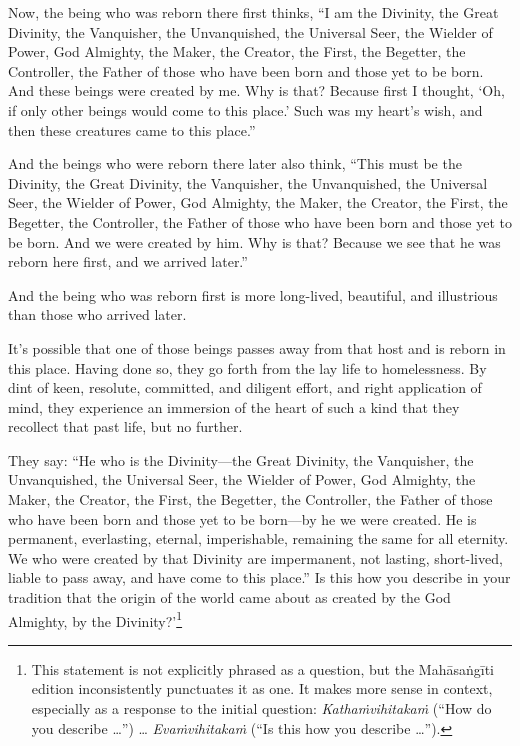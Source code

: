 \documentclass[12pt,openany]{book}%
\begin{document}
Now, the being who was reborn there first thinks, “I am the Divinity, the Great Divinity, the Vanquisher, the Unvanquished, the Universal Seer, the Wielder of Power,  God Almighty, the Maker, the Creator, the First, the Begetter, the Controller, the Father of those who have been born and those yet to be born. And these beings were created by me. Why is that? Because first I thought, ‘Oh, if only other beings would come to this place.’ Such was my heart’s wish, and then these creatures came to this place.” 

And the beings who were reborn there later also think, “This must be the Divinity, the Great Divinity, the Vanquisher, the Unvanquished, the Universal Seer, the Wielder of Power, God Almighty, the Maker, the Creator, the First, the Begetter, the Controller, the Father of those who have been born and those yet to be born. And we were created by him. Why is that? Because we see that he was reborn here first, and we arrived later.” 

And the being who was reborn first is more long-lived, beautiful, and illustrious than those who arrived later. 

It’s possible that one of those beings passes away from that host and is reborn in this place. Having done so, they go forth from the lay life to homelessness. By dint of keen, resolute, committed, and diligent effort, and right application of mind, they experience an immersion of the heart of such a kind that they recollect that past life, but no further. 

They say: “He who is the Divinity—the Great Divinity, the Vanquisher, the Unvanquished, the Universal Seer, the Wielder of Power, God Almighty, the Maker, the Creator, the First, the Begetter, the Controller, the Father of those who have been born and those yet to be born—by he we were created. He is permanent, everlasting, eternal, imperishable, remaining the same for all eternity. We who were created by that Divinity are impermanent, not lasting, short-lived, liable to pass away, and have come to this place.” Is this how you describe in your tradition that the origin of the world came about as created by the God Almighty, by the Divinity?’\footnote{This statement is not explicitly phrased as a question, but the \textsanskrit{Mahāsaṅgīti} edition inconsistently punctuates it as one. It makes more sense in context, especially as a response to the initial question: \textit{\textsanskrit{Kathaṁvihitakaṁ}} (“How do you describe …”) … \textit{\textsanskrit{Evaṁvihitakaṁ}} (“Is this how you describe …”). } 
\end{document}
